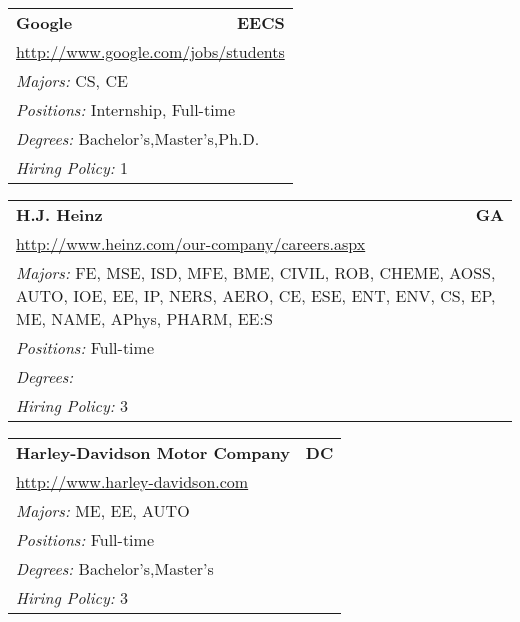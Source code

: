 \documentclass[twoside]{article}
\begin{document}
\begin{center}
\begin{multicols}{3}
\begin{FlushLeft}
\begin{minipage}{.9\columnwidth}
\end{minipage}
 
\begin{minipage}{.9\columnwidth}\begin{tabularx}{.95\columnwidth}{Xr}
                 {\Large\bf Google} & {\Large\bf EECS}\\
    \multicolumn{2}{p{.95\columnwidth}}{\url{http://www.google.com/jobs/students}}\\
    \multicolumn{2}{p{.95\columnwidth}}{\emph{Majors:} CS, CE}\\
    \multicolumn{2}{p{.95\columnwidth}}{\emph{Positions:} Internship, Full-time}\\
    \multicolumn{2}{p{.95\columnwidth}}{\emph{Degrees:} Bachelor's,Master's,Ph.D.}\\
    \multicolumn{2}{p{.95\columnwidth}}{\emph{Hiring Policy:} 1}\\
    \end{tabularx}
    
\end{minipage}
 
\begin{minipage}{.9\columnwidth}\begin{tabularx}{.95\columnwidth}{Xr}
                 {\Large\bf H.J. Heinz} & {\Large\bf GA}\\
    \multicolumn{2}{p{.95\columnwidth}}{\url{http://www.heinz.com/our-company/careers.aspx}}\\
    \multicolumn{2}{p{.95\columnwidth}}{\emph{Majors:} FE, MSE, ISD, MFE, BME, CIVIL, ROB, CHEME, AOSS, AUTO, IOE, EE, IP, NERS, AERO, CE, ESE, ENT, ENV, CS, EP, ME, NAME, APhys, PHARM, EE:S}\\
    \multicolumn{2}{p{.95\columnwidth}}{\emph{Positions:} Full-time}\\
    \multicolumn{2}{p{.95\columnwidth}}{\emph{Degrees:} }\\
    \multicolumn{2}{p{.95\columnwidth}}{\emph{Hiring Policy:} 3}\\
    \end{tabularx}
    
\end{minipage}
 
\begin{minipage}{.9\columnwidth}\begin{tabularx}{.95\columnwidth}{Xr}
                 {\Large\bf Harley-Davidson Motor Company} & {\Large\bf DC}\\
    \multicolumn{2}{p{.95\columnwidth}}{\url{http://www.harley-davidson.com}}\\
    \multicolumn{2}{p{.95\columnwidth}}{\emph{Majors:} ME, EE, AUTO}\\
    \multicolumn{2}{p{.95\columnwidth}}{\emph{Positions:} Full-time}\\
    \multicolumn{2}{p{.95\columnwidth}}{\emph{Degrees:} Bachelor's,Master's}\\
    \multicolumn{2}{p{.95\columnwidth}}{\emph{Hiring Policy:} 3}\\
    \end{tabularx}
    

\end{minipage}
\end{FlushLeft}
\end{multicols}
\end{center}
\end{document}
